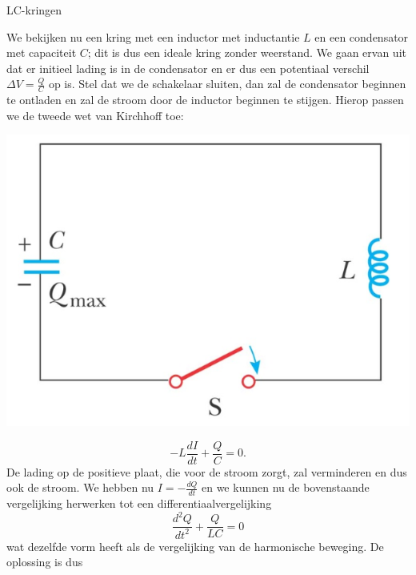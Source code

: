 \begin{app}[LC-kringen]{LC-kringen}
    \vspace{-0.2cm}
    \begin{minipage}{.73\textwidth}
        We bekijken nu een kring met een inductor met inductantie $L$ en een condensator met capaciteit $C$; dit is dus een ideale kring zonder weerstand. 
        We gaan ervan uit dat er initieel lading is in de condensator en er dus een potentiaal verschil $\Delta V = \tfrac{Q}{C}$ op is. Stel dat we de schakelaar sluiten, 
        dan zal de condensator beginnen te ontladen en zal de stroom door de inductor beginnen te stijgen. Hierop passen we de tweede wet van Kirchhoff toe:
    \end{minipage}
    \begin{minipage}{.23\textwidth}
        \vspace{0.3cm}\includegraphics[scale = 0.35]{Images/Magnetisme/LCKring}
    \end{minipage}
    \vspace{-0.3cm}
    \begin{equation*}
        -L\dfrac{dI}{dt} + \dfrac{Q}{C} = 0.
    \end{equation*}
    De lading op de positieve plaat, die voor de stroom zorgt, zal verminderen en dus ook de stroom. We hebben nu $I = -\tfrac{dQ}{dt}$ en we kunnen nu de bovenstaande vergelijking herwerken tot
    een differentiaalvergelijking
    \begin{equation*}
        \dfrac{d^{2}Q}{dt^{2}} + \dfrac{Q}{LC} = 0
    \end{equation*}
    wat dezelfde vorm heeft als de vergelijking van de harmonische beweging. De oplossing is dus


\end{app}
